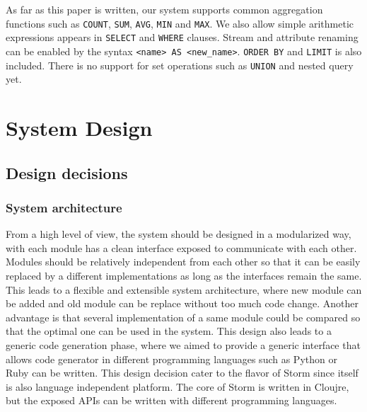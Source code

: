 \documentclass[conference, twocolumn, 11pt]{IEEEtran}
\theoremstyle{definition}
\begin{document}
As far as this paper is written, our system supports common aggregation functions such as \texttt{COUNT}, \texttt{SUM}, \texttt{AVG}, \texttt{MIN} and \texttt{MAX}. We also allow simple arithmetic expressions appears in \texttt{SELECT} and \texttt{WHERE} clauses. Stream and attribute renaming can be enabled by the syntax \texttt{<name> AS <new\_name>}. \texttt{ORDER BY} and \texttt{LIMIT} is also included. There is no support for set operations such as \texttt{UNION} and nested query yet.

\section{System Design}\label{sys-design}
\subsection{Design decisions}
\subsubsection{System architecture}
From a high level of view, the system should be designed in a modularized way, with each module has a clean interface exposed to communicate with each other. Modules should be relatively independent from each other so that it can be easily replaced by a different implementations as long as the interfaces remain the same. This leads to a flexible and extensible system architecture, where new module can be added and old module can be replace without too much code change. Another advantage is that several implementation of a same module could be compared so that the optimal one can be used in the system. This design also leads to a generic code generation phase, where we aimed to provide a generic interface that allows code generator in different programming languages such as Python or Ruby can be written. This design decision cater to the flavor of Storm since itself is also language independent platform. The core of Storm is written in Cloujre, but the exposed APIs can be written with different programming languages.
\end{document}
